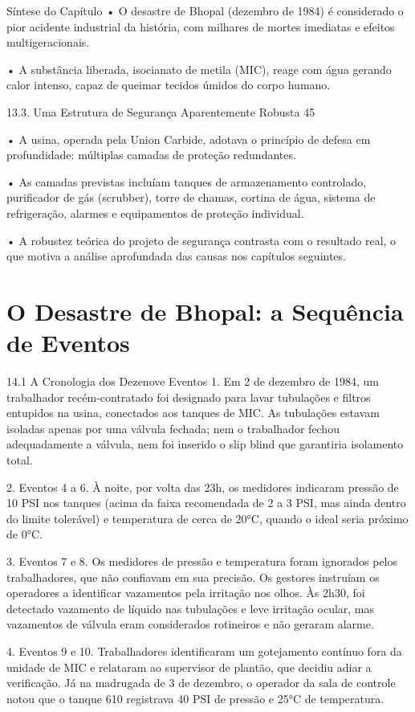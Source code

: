 Síntese do Capítulo • O desastre de Bhopal (dezembro de 1984) é considerado o pior acidente industrial da história, com milhares de mortes imediatas e efeitos multigeracionais.

• A substância liberada, isocianato de metila (MIC), reage com água gerando calor intenso, capaz de queimar tecidos úmidos do corpo humano.

13.3. Uma Estrutura de Segurança Aparentemente Robusta 45

• A usina, operada pela Union Carbide, adotava o princípio de defesa em profundidade: múltiplas camadas de proteção redundantes.

• As camadas previstas incluíam tanques de armazenamento controlado, purificador de gás (scrubber), torre de chamas, cortina de água, sistema de refrigeração, alarmes e equipamentos de proteção individual.

• A robustez teórica do projeto de segurança contrasta com o resultado real, o que motiva a análise aprofundada das causas nos capítulos seguintes.

\chapter{O Desastre de Bhopal: a Sequência de Eventos}

14.1 A Cronologia dos Dezenove Eventos 1. Em 2 de dezembro de 1984, um trabalhador recém-contratado foi designado para lavar tubulações e filtros entupidos na usina, conectados aos tanques de MIC. As tubulações estavam isoladas apenas por uma válvula fechada; nem o trabalhador fechou adequadamente a válvula, nem foi inserido o slip blind que garantiria isolamento total.

2. Eventos 4 a 6. À noite, por volta das 23h, os medidores indicaram pressão de 10 PSI nos tanques (acima da faixa recomendada de 2 a 3 PSI, mas ainda dentro do limite tolerável) e temperatura de cerca de 20°C, quando o ideal seria próximo de 0°C.

3. Eventos 7 e 8. Os medidores de pressão e temperatura foram ignorados pelos trabalhadores, que não confiavam em sua precisão. Os gestores instruíam os operadores a identificar vazamentos pela irritação nos olhos. Às 2h30, foi detectado vazamento de líquido nas tubulações e leve irritação ocular, mas vazamentos de válvula eram considerados rotineiros e não geraram alarme.

4. Eventos 9 e 10. Trabalhadores identificaram um gotejamento contínuo fora da unidade de MIC e relataram ao supervisor de plantão, que decidiu adiar a verificação. Já na madrugada de 3 de dezembro, o operador da sala de controle notou que o tanque 610 registrava 40 PSI de pressão e 25°C de temperatura.

